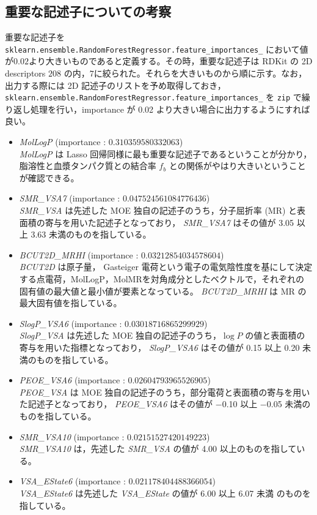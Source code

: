 \documentclass[a4j,11pt]{jarticle}
\begin{document}
\subsection{重要な記述子についての考察}
重要な記述子を \texttt{sklearn.ensemble.RandomForestRegressor.feature\_importances\_} において値が$0.02$より大きいものであると定義する。その時，重要な記述子は RDKit の 2D descriptors $208$ の内，$7$に絞られた。それらを大きいものから順に示す。なお，出力する際には 2D 記述子のリストを予め取得しておき， \texttt{sklearn.ensemble.RandomForestRegressor.feature\_importances\_} を \texttt{zip} で繰り返し処理を行い，importance が 0.02 より大きい場合に出力するようにすれば良い。\\
\begin{itemize}
\item  \textit{MolLogP} (importance : $0.310359580332063$) \\
 \textit{MolLogP} は Lasso 回帰同様に最も重要な記述子であるということが分かり，脂溶性と血漿タンパク質との結合率 $f_b$ との関係がやはり大きいということが確認できる。
\item  \textit{SMR\_VSA7} (importance : $0.047524561084776436$) \\
 \textit{SMR\_VSA} は先述した MOE 独自の記述子のうち，分子屈折率 (MR) と表面積の寄与を用いた記述子となっており， \textit{SMR\_VSA7} はその値が 3.05 以上 3.63 未満のものを指している。\cite{smr} \cite{smr_vsa}
\item  \textit{BCUT2D\_MRHI} (importance : $0.03212854034578604$) \\
 \textit{BCUT2D} は原子量， Gasteiger 電荷という電子の電気陰性度を基にして決定する点電荷\cite{gas}，MolLogP，MolMRを対角成分としたベクトルで，それぞれの固有値の最大値と最小値が要素となっている。\cite{BCUT2D}
 \textit{BCUT2D\_MRHI} は MR の最大固有値を指している。
\item  \textit{SlogP\_VSA6} (importance : $0.03018716865299929$) \\
 \textit{SlogP\_VSA} は先述した MOE 独自の記述子のうち，$\log{P}$ の値と表面積の寄与を用いた指標となっており， \textit{SlogP\_VSA6} はその値が 0.15 以上 0.20 未満のものを指している。 \cite{smr} \cite{smr_vsa}
\item  \textit{PEOE\_VSA6} (importance : $0.02604793965526905$) \\
 \textit{PEOE\_VSA} は MOE 独自の記述子のうち，部分電荷と表面積の寄与を用いた記述子となっており， \textit{PEOE\_VSA6} はその値が $-$0.10 以上 $-$0.05 未満のものを指している。\cite{smr} \cite{smr_vsa}
\item  \textit{SMR\_VSA10} (importance : $0.02151527420149223$) \\
 \textit{SMR\_VSA10} は，先述した \textit{SMR\_VSA} の値が 4.00 以上のものを指している。\cite{smr} \cite{smr_vsa}
\item  \textit{VSA\_EState6} (importance : $0.021178404488366054$) \\
 \textit{VSA\_EState6} は先述した \textit{VSA\_EState} の値が 6.00 以上 6.07 未満 のものを指している。\cite{estate_vsa}
\end{itemize}
\end{document}
